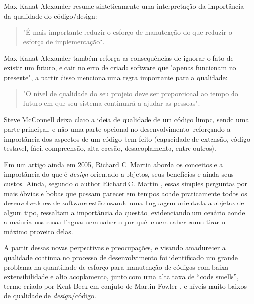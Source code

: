 \documentclass[12pt]{article}
\begin{document}
Max Kanat-Alexander \cite{CODE_SIMPLICITY} resume sinteticamente uma interpretação da importância da qualidade do código/design: 
\begin{quote}
 "É mais importante reduzir o esforço de manutenção do que reduzir o esforço de implementação".
\end{quote}

Max Kanat-Alexander \cite{CODE_SIMPLICITY} também reforça as consequências de ignorar o fato de existir um futuro, e cair no erro de criado software que "apenas funcionam no presente", a partir disso menciona uma regra importante para a qualidade: 
\begin{quote}
 "O nível de qualidade do seu projeto deve ser proporcional ao tempo do futuro em que seu sistema continuará a ajudar as pessoas".
\end{quote} 

Steve McConnell \cite{CODE_COMPLETE_2} deixa claro a ideia de qualidade de um código limpo, sendo uma parte principal, e não uma parte opcional no desenvolvimento, reforçando a importância dos aspectos de um código bem feito (capacidade de extensão, código testavel, fácil compreensão, alta coesão, desacoplamento, entre outros).

Em um artigo ainda em 2005, Richard C. Martin \cite{THE_PRINCIPLES_OF_OOD} aborda os conceitos e a importância do que é \textit{design} orientado a objetos, seus benefícios e ainda seus custos.
Ainda, segundo o author Richard C. Martin \cite{THE_PRINCIPLES_OF_OOD}, essas simples perguntas por mais óbvias e bobas que possam parecer em tempos aonde praticamente todos os desenvolvedores de software estão usando uma linguagem orientada a objetos de algum tipo, ressaltam a importância da questão, evidenciando um cenário aonde a maioria usa essas línguas sem saber o por quê, e sem saber como tirar o máximo proveito delas.
	 

A partir dessas novas perpectivas e preocupações, e visando amadurecer a qualidade continua no processo de desenvolvimento foi identificado um grande problema na quantidade de esforço para manutenção de códigos com baixa extensibilidade e alto acoplamento, junto com uma alta taxa de “code smells”, termo criado por Kent Beck em conjuto de Martin Fowler \cite{MARTIN_FOWLER_REFACTORING}, e níveis muito baixos de qualidade de \textit{design}/código.

\end{document}
